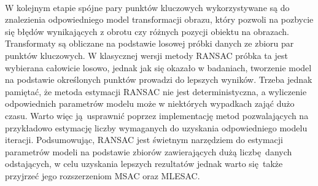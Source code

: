 \documentclass[../main.tex]{subfiles}
\begin{document}
    \paragraph{}
    W kolejnym etapie spójne pary punktów kluczowych wykorzystywane są do znalezienia odpowiedniego model transformacji obrazu, który pozwoli na pozbycie się błędów wynikających z obrotu czy różnych pozycji obiektu na obrazach. Transformaty są obliczane na podstawie losowej próbki danych ze zbioru par punktów kluczowych. W klasycznej wersji metody RANSAC próbka ta jest wybierana całowicie losowo, jednak jak się okazało w badaniach, tworzenie model na podstawie określonych punktów prowadzi do lepszych wyników. Trzeba jednak pamiętać, że metoda estymacji RANSAC nie jest deterministyczna, a wyliczenie odpowiednich parametrów modelu może w niektórych wypadkach zająć dużo czasu. Warto więc ją usprawnić poprzez implementację metod pozwalających na przykładowo estymację liczby wymaganych do uzyskania odpowiedniego modelu iteracji. Podsumowując, RANSAC jest świetnym narzędziem do estymacji parametrów modeli na podstawie zbiorów zawierających dużą liczbę danych odstających, w celu uzyskania lepszych rezultatów jednak warto się także przyjrzeć jego rozszerzeniom MSAC oraz MLESAC.
\end{document}
